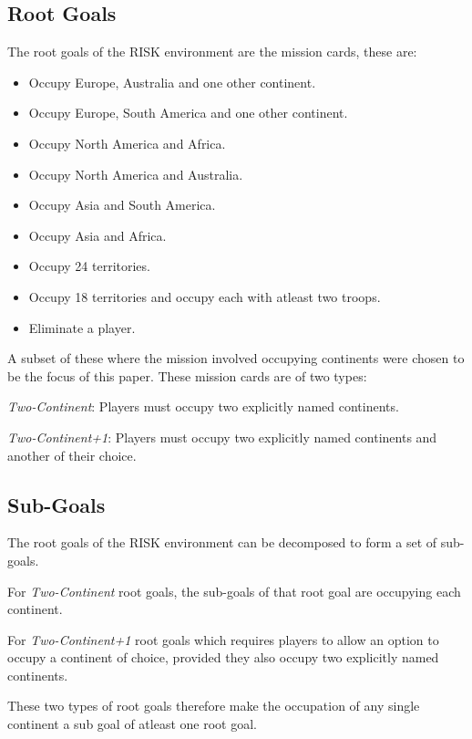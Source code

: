 \documentclass[parskip]{cs4rep}
\begin{document}
\subsection{Root Goals}

The root goals of the RISK environment are the mission cards, these are:

\begin{itemize}
\item
Occupy Europe, Australia and one other continent.
\item
Occupy Europe, South America and one other continent.
\item
Occupy North America and Africa.
\item
Occupy North America and Australia.
\item
Occupy Asia and South America.
\item
Occupy Asia and Africa.
\item
Occupy 24 territories.
\item
Occupy 18 territories and occupy each with atleast two troops.
\item
Eliminate a player.
\newline
\end{itemize}

A subset of these where the mission involved occupying continents were chosen to be the focus of this paper. These mission cards are of two types:

\textit{Two-Continent}: Players must occupy two explicitly named continents.

\textit{Two-Continent+1}: Players must occupy two explicitly named continents and another of their choice.

\subsection{Sub-Goals}

The root goals of the RISK environment can be decomposed to form a set of sub-goals. 

For \textit{Two-Continent} root goals, the sub-goals of that root goal are occupying each continent. 

For \textit{Two-Continent+1} root goals which requires players to allow an option to occupy a continent of choice, provided they also occupy two explicitly named continents. 

These two types of root goals therefore make the occupation of any single continent a sub goal of atleast one root goal.
\end{document}
